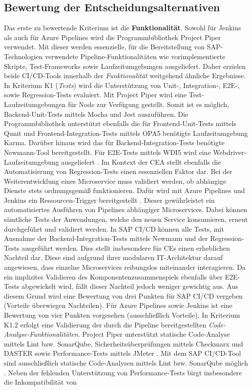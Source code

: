 \subsection{Bewertung der Entscheidungsalternativen}
\label{sec:Bewertung}
Das erste zu bewertende Kriterium ist die \textbf{Funktionalität}. Sowohl für Jenkins als auch für Azure Pipelines wird die Programmbibliothek Project Piper verwendet. Mit dieser werden essenzielle, für die Bereitstellung von SAP-Technologien verwendete Pipeline-Funktionalitäten wie vorimplementierte Skripte, Test-Frameworks sowie Laufzeitumgebungen ausgeliefert. Daher erzielen beide CI/CD-Tools innerhalb der \textit{Funktionalität} weitgehend ähnliche Ergebnisse. In Kriterium K1 (\textit{Tests}) wird die Unterstützung von Unit-, Integration-, E2E-, sowie Regression-Tests evaluiert. Mit Project Piper wird eine Test-Laufzeitumgebungen für Node zur Verfügung gestellt. Somit ist es möglich, Backend-Unit-Tests mittels Mocha und Jest auszuführen. Die Programmbibliothek unterstützt ebenfalls die für Frontend-Unit-Tests mittels Qunit und Frontend-Integration-Tests mittels OPA5 benötigte Laufzeitumgebung Karma. Darüber hinaus wird das für Backend-Integration-Tests benötigte Newmann-Tool bereitgestellt. Für E2E-Tests mittels WDI5 wird eine Webdriver-Laufzeitumgebung ausgeliefert \cite[Z. 66 ff.]{TestDeveloperSAPHyperspaceAdoption&Onboarding.}. Im Kontext der CEA stellt ebenfalls die Automatisierung von Regression-Tests einen essenziellen Faktor dar. Bei der Weiterentwicklung eines Microservice muss validiert werden, ob abhängige Dienste stets ordnungsgemäß funktionieren. Dafür wird mit Azure Pipelines und Jenkins ein Ressourcen-Trigger bereitgestellt \cite{Steved0x.20230410}\cite{.20230417}. Dieser gewährleistet ein automatisiertes Ausführen von Pipelines abhängiger Microservices. Dabei können sämtliche Tests der Anwendungen, welche den neuen Service konsumieren, erneut durchgeführt und validiert werden. In SAP CI/CD können alle Tests, mit Ausnahme der Backend-Integration-Tests mittels Newmann und der Regression-Tests ausgeführt werden. Dies stellt insbesondere für CEs einen erheblichen Nachteil dar. Diese sind aufgrund ihrer modularen IT-Architektur darauf angewiesen, dass einzelne Microservices reibungslos miteinander interagieren. Da ein implizites Validieren des Komponentenzusammenspiels ebenfalls über E2E-Tests abgewickelt wird, fällt dieser Nachteil jedoch weniger gewichtig aus. Aus diesem Grund wird eine Bewertung von drei Punkten für SAP CI/CD vergeben (Vorteile überwiegen Nachteilen). Für Azure Pipelines sowie Jenkins ist eine Bewertung von vier Punkten vorgesehen (ausschließlich Vorteile). In Kriterium K1.2 erfolgt eine Validierung der durch die Pipeline bereitgestellten \textit{Code-Analyse-Funktionalitäten}. Project Piper unterstützt statische Code-Analyse mittels Lint bzw. SonarQube, Sicherheitsüberprüfungen mittels Checkmarx und DASTER sowie Performance-Tests mittels JMeter \cite[Z. 40 ff.]{ProductManagerSAPHyperspaceSecurityTools.}. Mit dem SAP CI/CD-Tool sind ausschließlich statische Code-Analysen mittels Lint bzw. SonarQube möglich \cite[Z. 50 ff.]{ProductOwnerSAPBTPProd&Infra.}. Neben der fehlenden Unterstützung von Performance-Tests birgt insbesondere die Inkompatibilität von 